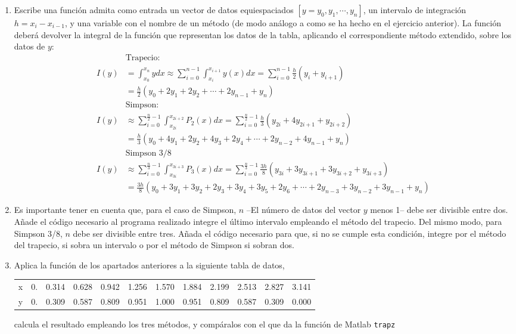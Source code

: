 \begin{enumerate}
\begin{enumerate}
\item Escribe una función admita como entrada un vector de datos equiespaciados $[y= y_0,y_1,\cdots,y_n]$, un intervalo de integración $h=x_i - x_{i-1}$, y una variable con el nombre de un método (de modo análogo a como se ha hecho en el ejercicio anterior). La función deberá devolver la integral de la función que representan los datos de la tabla, aplicando el correspondiente método extendido, sobre los datos de $y$:
\begin{align*}
 &\text{Trapecio:}\\
I(y)&=\int_{x_0}^{x_n}ydx \approx \sum_{i=0}^{n-1}\int_{x_i}^{x_{i+1}}y(x)dx=\sum_{i=0}^{n-1}\frac{h}{2}(y_i+y_{i+1})\\
&=\frac{h}{2}\left(y_0+2y_1+2y_2+\cdots+2y_{n-1}+y_n \right)\\
 &\text{Simpson:} \\
I(y)&\approx \sum_{i=0}^{\frac{n}{2}-1}\int_{x_{2i}}^{x_{2i+2}}P_2(x)dx=\sum_{i=0}^{\frac{n}{2}-1}\frac{h}{3}(y_{2i}+4y_{2i+1}+y_{2i+2})\\
&= \frac{h}{3}(y_0+4y_1+2y_2+4y_3+2y_4+\cdots + 2y_{n-2}+4y_{n-1}+y_n)\\
&\text{Simpson 3/8}\\
I(y)&\approx \sum_{i=0}^{\frac{n}{3}-1}\int_{x_{3i}}^{x_{3i+3}}P_3(x)dx=\sum_{i=0}^{\frac{n}{3}-1}\frac{3h}{8}(y_{3i}+3y_{3i+1}+3y_{3i+2}+y_{3i+3})\\
&= \frac{3h}{8}(y_0+3y_1+3y_2+2y_3+3y_4+3y_5+2y_6+ \cdots + 2y_{n-3}+3y_{n-2}+3y_{n-1}+y_n)
\end{align*}

\item Es importante tener en cuenta que, para el caso de Simpson, $n$ --El número de datos del vector $y$ menos 1-- debe ser divisible entre dos. Añade el código necesario al programa realizado integre el último intervalo empleando el método del trapecio. Del mismo modo, para Simpson 3/8, $n$ debe ser divisible entre tres. Añada el código necesario para que, si no se cumple esta condición, integre por el método del trapecio, si sobra un intervalo o por el método de Simpson si sobran dos.

\item Aplica la función de los apartados anteriores a la siguiente tabla de datos,

\begin{tabular}{r r r r r r r r r r r r}
\hline
x & 0. &0.314 & 	0.628 &	0.942 &	1.256 &	1.570 &	1.884 &	 2.199 &	2.513 &	 2.827 &	3.141\\
y & 0. &0.309 &	0.587 &	0.809 &	0.951 &	1.000 &	0.951 &    0.809 &	0.587 &	0.309 &	0.000\\
\hline
\end{tabular}
calcula el resultado empleando los tres métodos, y compáralos con el que da la función de Matlab \texttt{trapz}
\end{enumerate}


\end{enumerate}
